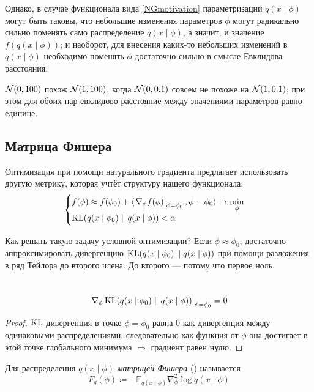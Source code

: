 Однако, в случае функционала вида \eqref{NGmotivation} параметризации $q(x \mid \phi)$ могут быть таковы, что небольшие изменения параметров $\phi$ могут радикально сильно поменять само распределение $q(x \mid \phi)$, а значит, и значение $f(q(x \mid \phi))$; и наоборот, для внесения каких-то небольших изменений в $q(x \mid \phi)$ необходимо поменять $\phi$ достаточно сильно в смысле Евклидова расстояния.

\begin{example}
$\mathcal{N}(0, 100)$ похож $\mathcal{N}(1, 100)$, когда $\mathcal{N}(0, 0.1)$ совсем не похоже на $\mathcal{N}(1, 0.1)$; при этом для обоих пар евклидово расстояние между значениями параметров равно единице.
\end{example} 

\subsection{Матрица Фишера}\label{appendix:fishermatrix}

Оптимизация при помощи натурального градиента предлагает использовать другую метрику, которая учтёт структуру нашего функционала:
$$\begin{cases}
f(\phi) \approx f(\phi_0) + \langle \left. \nabla_\phi f(\phi) \right|_{\phi = \phi_0}, \phi - \phi_0 \rangle \to \min\limits_{\phi} \\
\operatorname{KL} (q(x \mid \phi_0) \parallel q(x \mid \phi)) < \alpha
\end{cases}$$

Как решать такую задачу условной оптимизации? Если $\phi \approx \phi_0$, достаточно аппроксимировать дивергенцию $\operatorname{KL} (q(x \mid \phi_0) \parallel q(x \mid \phi))$ при помощи разложения в ряд Тейлора до второго члена. До второго --- потому что первое ноль.

\begin{proposition}\,
\begin{equation*}
\left. \nabla_{\phi} \operatorname{KL} (q(x \mid \phi_0) \parallel q(x \mid \phi)) \right|_{\phi = \phi_0} = 0
\end{equation*}
\begin{proof}
$\operatorname{KL}$-дивергенция в точке $\phi = \phi_0$ равна 0 как дивергенция между одинаковыми распределениями, следовательно как функция от $\phi$ она достигает в этой точке глобального минимума $\Rightarrow$ градиент равен нулю.
\end{proof}
\end{proposition}

\begin{definition}
Для распределения $q(x \mid \phi)$ \emph{матрицей Фишера} () называется
$$F_q(\phi) \coloneqq -\mathbb{E}_{q(x \mid \phi)} \nabla^2_\phi \log q(x \mid \phi)$$
\end{definition}

